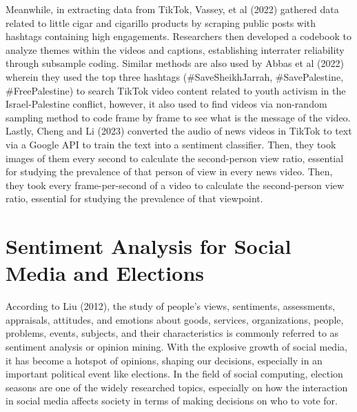 Meanwhile, in extracting data from TikTok, Vassey, et al (2022) gathered data related to little cigar and cigarillo products by scraping public posts with hashtags containing high engagements.\cite{RRL_Vassey-2022} Researchers then developed a codebook to analyze themes within the videos and captions, establishing interrater reliability through subsample coding. Similar methods are also used by Abbas et al (2022) wherein they used the top three hashtags (\#SaveSheikhJarrah, \#SavePalestine, \#FreePalestine) to search TikTok video content related to youth activism in the Israel-Palestine conflict, however, it also used to find videos via non-random sampling method to code frame by frame to see what is the message of the video.\cite{RRL_Abbas-2022} Lastly, Cheng and Li (2023) converted the audio of news videos in TikTok to text via a Google API to train the text into a sentiment classifier.\cite{RRL_Cheng-2024} Then, they took images of them every second to calculate the second-person view ratio, essential for studying the prevalence of that person of view in every news video. Then, they took every frame-per-second of a video to calculate the second-person view ratio, essential for studying the prevalence of that viewpoint.

\section{Sentiment Analysis for Social Media and Elections}
According to Liu (2012), the study of people's views, sentiments, assessments, appraisals, attitudes, and emotions about goods, services, organizations, people, problems, events, subjects, and their characteristics is commonly referred to as sentiment analysis or opinion mining.\cite{RRL_Liu-2012} With the explosive growth of social media, it has become a hotspot of opinions, shaping our decisions, especially in an important political event like elections. In the field of social computing, election seasons are one of the widely researched topics, especially on how the interaction in social media affects society in terms of making decisions on who to vote for. 

